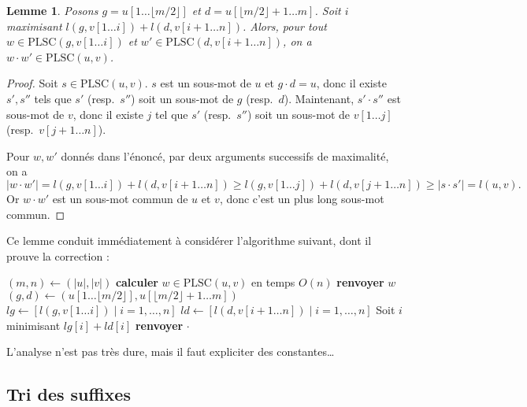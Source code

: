 \documentclass[a4paper, 11pt]{article}
\newtheorem*{lemma}{Lemme}
\begin{document}
\begin{lemma}
  Posons $g = u[1 … \lfloor m/2 \rfloor]$ et $d = u[\lfloor m/2 \rfloor + 1 …
  m]$. Soit $i$ maximisant $l(g, v[1 … i]) + l(d, v[i+1 … n])$. Alors, pour tout
  $w \in \mathrm{PLSC}(g, v[1 … i])$ et $w' \in \mathrm{PLSC}(d, v[i+1 … n])$,
  on a $w \cdot w' \in \mathrm{PLSC}(u,v)$.
\end{lemma}
\begin{proof}
  Soit $s \in \mathrm{PLSC}(u,v)$. $s$ est un sous-mot de $u$ et $g \cdot d =
  u$, donc il existe $s', s''$ tels que $s'$ (resp.\ $s''$) soit un sous-mot de
  $g$ (resp.\ $d$). Maintenant, $s' \cdot s''$ est sous-mot de $v$, donc il
  existe $j$ tel que $s'$ (resp.\ $s''$) soit un sous-mot de $v[1 … j]$ (resp.\
  $v[j+1 … n]$).

  Pour $w, w'$ donnés dans l'énoncé, par deux arguments successifs de
  maximalité, on a
  \[ |w \cdot w'| = l(g, v[1 … i]) + l(d, v[i+1 … n])
    \geq l(g, v[1 … j]) + l(d, v[j+1 … n]) \geq |s \cdot s'| = l(u,v). \]
  Or $w \cdot w'$ est un sous-mot commun de $u$ et $v$, donc c'est un plus long
  sous-mot commun.
\end{proof}

Ce lemme conduit immédiatement à considérer l'algorithme suivant, dont il prouve
la correction :

\begin{algorithm}
  \begin{algorithmic}
    \State $(m, n) \gets (|u|,|v|)$
    \State \textbf{calculer} $w \in \mathrm{PLSC}(u,v)$ en temps $O(n)$
    \State \textbf{renvoyer} $w$
    \Else
    \State $(g,d) \gets (u[1 … \lfloor m/2 \rfloor], u[\lfloor m/2 \rfloor + 1…m])$
    \State $lg \gets [l(g, v[1 … i]) \mid i = 1, \ldots, n]$
    \State $ld \gets [l(d, v[i+1 … n]) \mid i = 1, \ldots, n]$
    \State Soit $i$ minimisant $lg[i] + ld[i]$
    \State \textbf{renvoyer}  $\cdot$
    \Call{Hirschberg}{$d,v[i+1…n]$}
    \EndIf
    \EndProcedure
  \end{algorithmic}
\end{algorithm}

L'analyse n'est pas très dure, mais il faut expliciter des constantes…


\newpage

\subsection{Tri des suffixes}
\end{document}
